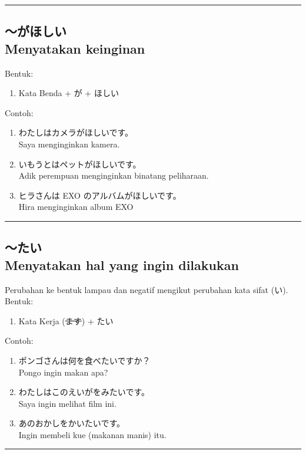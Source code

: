 \vspace{0.2cm}\hrule height 1pt\vspace{0.2cm}


\subsection*{
    ～がほしい \\
    Menyatakan keinginan
}
Bentuk:
\begin{enumerate}
    \item Kata Benda + が + ほしい
\end{enumerate}
Contoh: 
\begin{enumerate}
    \item わたしはカメラがほしいです。
    \\ Saya menginginkan kamera.
    \item いもうとはペットがほしいです。
    \\ Adik perempuan menginginkan binatang peliharaan.
    \item ヒラさんは EXO のアルバムがほしいです。
    \\ Hira menginginkan album EXO
\end{enumerate}

\vspace{0.2cm}\hrule height 1pt\vspace{0.2cm}

\newpage
\subsection*{
    ～たい \\
    Menyatakan hal yang ingin dilakukan
}
Perubahan ke bentuk lampau dan negatif mengikut perubahan kata sifat (い).\\
Bentuk:
\begin{enumerate}
    \item Kata Kerja (\sout{ます}) + たい
\end{enumerate}
Contoh: 
\begin{enumerate}
    \item ポンゴさんは何を食べたいですか？
    \\ Pongo ingin makan apa?
    \item わたしはこのえいがをみたいです。
    \\ Saya ingin melihat film ini.
    \item あのおかしをかいたいです。
    \\ Ingin membeli kue (makanan manis) itu.
\end{enumerate}

\vspace{0.2cm}\hrule height 1pt\vspace{0.2cm}

